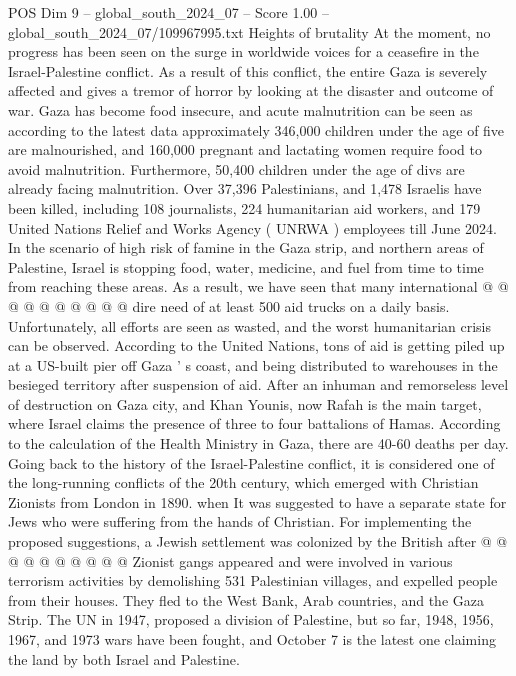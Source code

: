 \begin{textsample}{POS Dim 9 – global\_south\_2024\_07 – Score 1.00 – global\_south\_2024\_07/109967995.txt}  \label{ex:f9_pos_114}
Heights of brutality At the moment, no progress has been seen on the surge in worldwide voices for a ceasefire in the Israel-Palestine conflict.
As a result of this conflict, the entire Gaza is severely affected and gives a tremor of horror by looking at the disaster and outcome of war.
Gaza has become food insecure, and acute malnutrition can be seen as according to the latest data approximately 346,000 children under the age of five are malnourished, and 160,000 pregnant and lactating women require food to avoid malnutrition.
Furthermore, 50,400 children under the age of divs are already facing malnutrition.
Over 37,396 Palestinians, and 1,478 Israelis have been killed, including 108 journalists, 224 humanitarian aid workers, and 179 United Nations Relief and Works Agency ( UNRWA ) employees till June 2024.
In the scenario of high risk of famine in the Gaza strip, and northern areas of Palestine, Israel is stopping food, water, medicine, and fuel from time to time from reaching these areas.
As a result, we have seen that many international @ @ @ @ @ @ @ @ @ @ dire need of at least 500 aid trucks on a daily basis.
Unfortunately, all efforts are seen as wasted, and the worst humanitarian crisis can be observed.
According to the United Nations, tons of aid is getting piled up at a US-built pier off Gaza ' s coast, and being distributed to warehouses in the besieged territory after suspension of aid.
After an inhuman and remorseless level of destruction on Gaza city, and Khan Younis, now Rafah is the main target, where Israel claims the presence of three to four battalions of Hamas.
According to the calculation of the Health Ministry in Gaza, there are 40-60 deaths per day.
Going back to the history of the Israel-Palestine conflict, it is considered one of the long-running conflicts of the 20th century, which emerged with Christian Zionists from London in 1890. when It was suggested to have a separate state for Jews who were suffering from the hands of Christian.
For implementing the proposed suggestions, a Jewish settlement was colonized by the British after @ @ @ @ @ @ @ @ @ @ Zionist gangs appeared and were involved in various terrorism activities by demolishing 531 Palestinian villages, and expelled people from their houses.
They fled to the West Bank, Arab countries, and the Gaza Strip.
The UN in 1947, proposed a division of Palestine, but so far, 1948, 1956, 1967, and 1973 wars have been fought, and October 7 is the latest one claiming the land by both Israel and Palestine.

\end{textsample}
